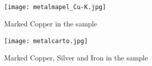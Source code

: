 
%



\begingroup
	
%				
\endgroup





\appendix
\clearpage
{}
\setcounter{chapter}{0}
\renewcommand{\thechapter}{\Alph{chapter}}

















\begin{figure}[H]
  \centering
  \begin{minipage}[b]{0.48\textwidth}
    \texttt{[image: metalmapel\_Cu-K.jpg]}
    \caption{Marked Copper in the sample}
  \end{minipage}
  \hfill
  \begin{minipage}[b]{0.48\textwidth}
    \texttt{[image: metalcarto.jpg]}
    \caption{Marked Copper, Silver and Iron in the sample}
  \end{minipage}
\end{figure}